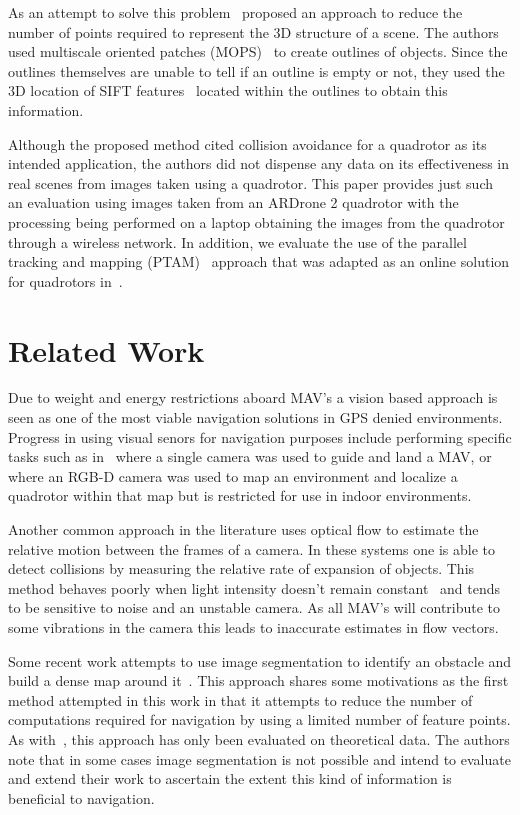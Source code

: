 \documentclass{acmsiggraph}
\begin{document}
As an attempt to solve this problem~\cite{lee2011} proposed an approach to reduce the number of points required to 
represent the 3D structure of a scene.  The authors used multiscale oriented patches (MOPS)~\cite{BSW05} to create outlines of 
objects.  Since the outlines themselves are unable to tell if an outline is empty or not, they used the 3D location of SIFT 
features~\cite{lowe2004} located within the outlines to obtain this information.  

Although the proposed method cited collision avoidance for a quadrotor as its intended application, the authors did not 
dispense any data on its effectiveness in real scenes from images taken using a quadrotor.  This paper provides just such an 
evaluation using images taken from an ARDrone 2 quadrotor with the processing being performed on a laptop obtaining the 
images from the quadrotor through a wireless network. In addition, we evaluate the use of the parallel tracking and 
mapping (PTAM)~\cite{klein07parallel} approach that was adapted as an online solution for quadrotors in~\cite{weiss2011}.

\section{Related Work}
Due to weight and energy restrictions aboard MAV's a vision based approach is seen as one of the most viable navigation 
solutions in GPS denied environments.  Progress in using visual senors for navigation purposes include performing specific 
tasks such as in~\cite{johnson2005} where a single camera was used to guide and land a MAV, or~\cite{huang2011isrr} where an 
RGB-D camera was used to map an environment and localize a quadrotor within that map but is restricted for use in indoor
environments.

Another common approach in the literature uses optical flow to estimate the relative motion between the frames of a camera.
In these systems one is able to detect collisions by measuring the relative rate of expansion of objects.  This method 
behaves poorly when light intensity doesn't remain constant~\cite{horn1981} and tends to be sensitive to noise and
an unstable camera.  As all MAV's will contribute to some vibrations in the camera this leads to inaccurate estimates in
flow vectors.

Some recent work attempts to use image segmentation to identify an obstacle and build a dense map around it~\cite{ha2012}.  
This approach shares some motivations as the first method attempted in this work in that it attempts to reduce the number
of computations required for navigation by using a limited number of feature points.  As with~\cite{lee2011}, this approach
has only been evaluated on theoretical data.  The authors note that in some cases image segmentation is not possible and 
intend to evaluate and extend their work to ascertain the extent this kind of information is beneficial to navigation.
\end{document}

